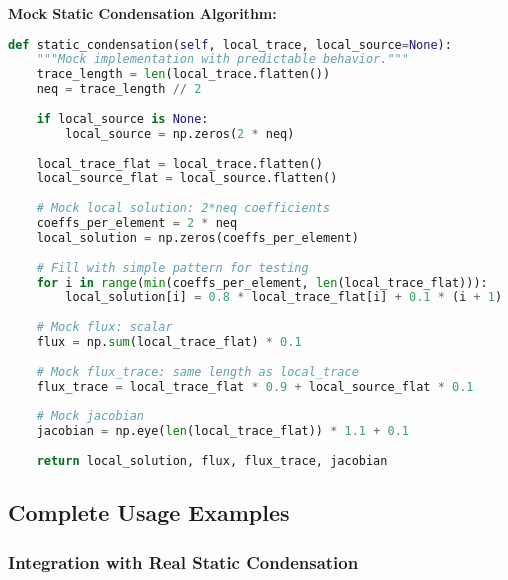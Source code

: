 \textbf{Mock Static Condensation Algorithm:}
\begin{lstlisting}[language=Python, caption=Mock Static Condensation Details]
def static_condensation(self, local_trace, local_source=None):
    """Mock implementation with predictable behavior."""
    trace_length = len(local_trace.flatten())
    neq = trace_length // 2
    
    if local_source is None:
        local_source = np.zeros(2 * neq)
    
    local_trace_flat = local_trace.flatten()
    local_source_flat = local_source.flatten()
    
    # Mock local solution: 2*neq coefficients
    coeffs_per_element = 2 * neq
    local_solution = np.zeros(coeffs_per_element)
    
    # Fill with simple pattern for testing
    for i in range(min(coeffs_per_element, len(local_trace_flat))):
        local_solution[i] = 0.8 * local_trace_flat[i] + 0.1 * (i + 1)
    
    # Mock flux: scalar
    flux = np.sum(local_trace_flat) * 0.1
    
    # Mock flux_trace: same length as local_trace
    flux_trace = local_trace_flat * 0.9 + local_source_flat * 0.1
    
    # Mock jacobian
    jacobian = np.eye(len(local_trace_flat)) * 1.1 + 0.1
    
    return local_solution, flux, flux_trace, jacobian
\end{lstlisting}

\subsection{Complete Usage Examples}
\label{subsec:flux_jump_complete_examples}

\subsubsection{Integration with Real Static Condensation}

